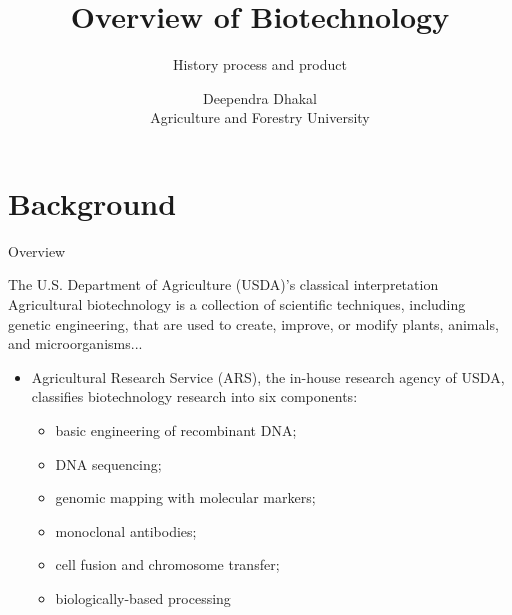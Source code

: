 \documentclass[
  ignorenonframetext,
  aspectratio=169]{beamer}
\title{Overview of Biotechnology}
\subtitle{History process and product}
\author{Deependra Dhakal\\
Agriculture and Forestry University}
\date{}
\providecommand{\tightlist}{%
  \setlength{\itemsep}{0pt}\setlength{\parskip}{0pt}}
\begin{document}
\frame{\titlepage}

\begin{frame}[allowframebreaks]
  \tableofcontents[hideallsubsections]
\end{frame}
\hypertarget{background}{%
\section{Background}\label{background}}

\begin{frame}{Overview}
\protect\hypertarget{overview}{}
\begin{block}{The U.S. Department of Agriculture (USDA)'s classical interpretation}
Agricultural biotechnology is a collection of scientific techniques, including genetic engineering, that are used to create, improve, or modify plants, animals, and microorganisms...
\end{block}

\begin{itemize}
\tightlist
\item
  Agricultural Research Service (ARS), the in-house research agency of
  USDA, classifies biotechnology research into six components:

  \begin{itemize}
  \tightlist
  \item
    basic engineering of recombinant DNA;
  \item
    DNA sequencing;
  \item
    genomic mapping with molecular markers;
  \item
    monoclonal antibodies;
  \item
    cell fusion and chromosome transfer;
  \item
    biologically-based processing
  \end{itemize}
\end{itemize}
\end{frame}
\end{document}
